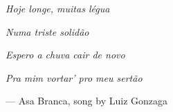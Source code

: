 \clearpage
\thispagestyle{empty}
\vspace*{\fill}

\begin{flushright}
    \emph{Hoje longe, muitas l\'egua}

    \emph{Numa triste solid\~ao}

    \emph{Espero a chuva cair de novo}

    \emph{Pra mim vortar' pro meu sert\~ao}

    --- Asa Branca, song by Luiz Gonzaga
\end{flushright}
\vspace*{\fill}

\clearpage